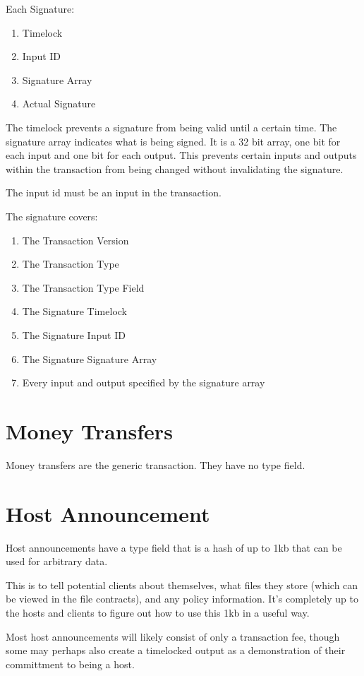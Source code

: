 \documentclass[twocolumn]{article}
\begin{document}
Each Signature:
\begin{enumerate}
	\item Timelock
	\item Input ID
	\item Signature Array
	\item Actual Signature
\end{enumerate}

The timelock prevents a signature from being valid until a certain time.
The signature array indicates what is being signed.
It is a 32 bit array, one bit for each input and one bit for each output.
This prevents certain inputs and outputs within the transaction from being changed without invalidating the signature.

The input id must be an input in the transaction.

The signature covers:
\begin{enumerate}
	\item The Transaction Version
	\item The Transaction Type
	\item The Transaction Type Field
	\item The Signature Timelock
	\item The Signature Input ID
	\item The Signature Signature Array
	\item Every input and output specified by the signature array
\end{enumerate}

\section{Money Transfers}
Money transfers are the generic transaction.
They have no type field.

\section{Host Announcement}
Host announcements have a type field that is a hash of up to 1kb that can be used for arbitrary data.

This is to tell potential clients about themselves, what files they store (which can be viewed in the file contracts), and any policy information.
It's completely up to the hosts and clients to figure out how to use this 1kb in a useful way.

Most host announcements will likely consist of only a transaction fee, though some may perhaps also create a timelocked output as a demonstration of their committment to being a host.
\end{document}

